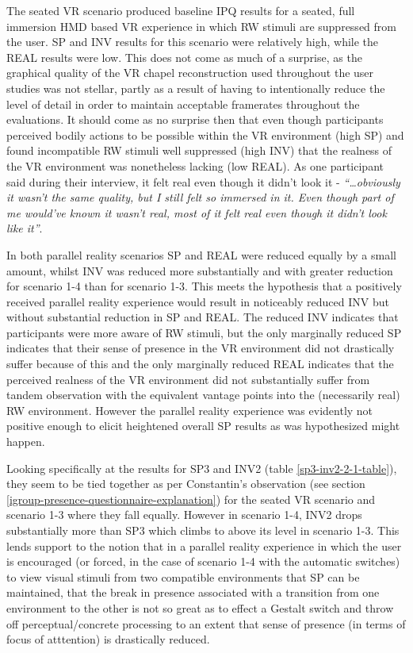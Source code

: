 The seated VR scenario produced baseline IPQ results for a seated, full immersion HMD based VR experience in which RW stimuli are suppressed from the user. SP and INV results for this scenario were relatively high, while the REAL results were low. This does not come as much of a surprise, as the graphical quality of the VR chapel reconstruction used throughout the user studies was not stellar, partly as a result of having to intentionally reduce the level of detail in order to maintain acceptable framerates throughout the evaluations. It should come as no surprise then that even though participants perceived bodily actions to be possible within the VR environment (high SP) and found incompatible RW stimuli well suppressed (high INV) that the realness of the VR environment was nonetheless lacking (low REAL). As one participant said during their interview, it felt real even though it didn't look it - \textit{``\ldots obviously it wasn't the same quality, but I still felt so immersed in it. Even though part of me would've known it wasn't real, most of it felt real even though it didn't look like it''}.

In both parallel reality scenarios SP and REAL were reduced equally by a small amount, whilst INV was reduced more substantially and with greater reduction for scenario 1-4 than for scenario 1-3. This meets the hypothesis that a positively received parallel reality experience would result in noticeably reduced INV but without substantial reduction in SP and REAL. The reduced INV indicates that participants were more aware of RW stimuli, but the only marginally reduced SP indicates that their sense of presence in the VR environment did not drastically suffer because of this and the only marginally reduced REAL indicates that the perceived realness of the VR environment did not substantially suffer from tandem observation with the equivalent vantage points into the (necessarily real) RW environment. However the parallel reality experience was evidently not positive enough to elicit heightened overall SP results as was hypothesized might happen.

Looking specifically at the results for SP3 and INV2 (table \ref{sp3-inv2-2-1-table}), they seem to be tied together as per Constantin's observation (see section \ref{igroup-presence-questionnaire-explanation}) for the seated VR scenario and scenario 1-3 where they fall equally. However in scenario 1-4, INV2 drops substantially more than SP3 which climbs to above its level in scenario 1-3. This lends support to the notion that in a parallel reality experience in which the user is encouraged (or forced, in the case of scenario 1-4 with the automatic switches) to view visual stimuli from two compatible environments that SP can be maintained, that the break in presence associated with a transition from one environment to the other is not so great as to effect a Gestalt switch and throw off perceptual/concrete processing to an extent that sense of presence (in terms of focus of atttention) is drastically reduced.

